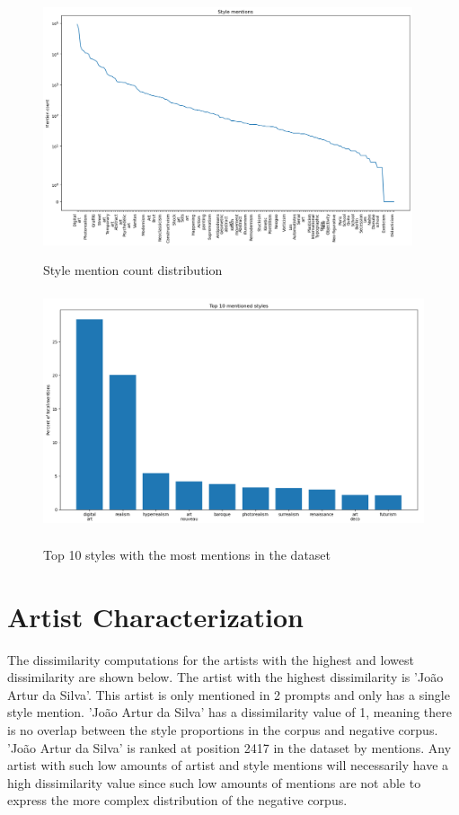 \begin{figure}[h]
    \begin{center}
        \includegraphics[height=7cm]{Bilder/styles_count_distribution_scale_symlog.png}\\[2.5ex]
    \end{center}
\caption{Style mention count distribution}
\end{figure} %

\begin{figure}[h]
    \begin{center}
        \includegraphics[height=7cm]{Bilder/top10_styles_percentages.png}\\[2.5ex]
    \end{center}
\caption{Top 10 styles with the most mentions in the dataset}
\end{figure} %

\section{Artist Characterization}

The dissimilarity computations for the artists with the highest and lowest dissimilarity are shown below. The artist with the highest dissimilarity is 'João Artur da Silva'. This artist is only mentioned in 2 prompts and only has a single style mention. 'João Artur da Silva' has a dissimilarity value of 1, meaning there is no overlap between the style proportions in the corpus and negative corpus. 'João Artur da Silva' is ranked at position 2417 in the dataset by mentions. Any artist with such low amounts of artist and style mentions will necessarily have a high dissimilarity value since such low amounts of mentions are not able to express the more complex distribution of the negative corpus.

